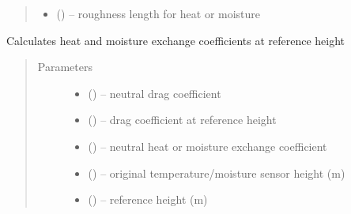 \documentclass[letterpaper,10pt,english]{sphinxmanual}
\begin{document}
\begin{fulllineitems}
\begin{quote}
\begin{description}
\begin{itemize}
\item {} 
 (\href{https://docs.python.org/3/library/functions.html\#float}{}) -- roughness length for heat or moisture

\end{itemize}


\end{description}\end{quote}

\end{fulllineitems}

\begin{fulllineitems}
\label{\detokenize{index:flux_subs.ctcq_calc}}
Calculates heat and moisture exchange coefficients at reference height
\begin{quote}\begin{description}
\item[{Parameters}] \leavevmode\begin{itemize}
\item {} 
 (\href{https://docs.python.org/3/library/functions.html\#float}{}) -- neutral drag coefficient

\item {} 
 (\href{https://docs.python.org/3/library/functions.html\#float}{}) -- drag coefficient at reference height

\item {} 
 (\href{https://docs.python.org/3/library/functions.html\#float}{}) -- neutral heat  or moisture exchange coefficient
\item {} 
 (\href{https://docs.python.org/3/library/functions.html\#float}{}) -- original temperature/moisture sensor height (m)

\item {} 
 (\href{https://docs.python.org/3/library/functions.html\#float}{}) -- reference height (m)


\end{itemize}
\end{description}
\end{quote}
\end{fulllineitems}
\end{document}
